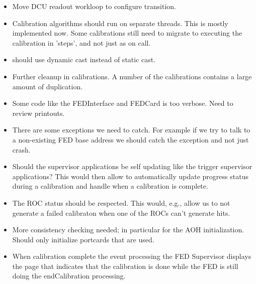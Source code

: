 \begin{itemize}
\item Move DCU readout workloop to configure transition.
\item Calibration algorithms should run on separate threads.
      This is mostly implemented now. Some calibrations 
      still need to migrate to executing the calibration
      in 'steps', and not just as on call. 
\item should use dynamic cast instead of static cast.
\item Further cleanup in calibrations. A number of the
      calibrations contains a large amount of duplication.
\item Some code like the FEDInterface and FEDCard is too verbose.
      Need to review printouts.
\item There are some exceptions we need to catch. For example
      if we try to talk to a non-existing FED base address we
      should catch the exception and not just crash.
\item Should the supervisor applications be self updating like
      the trigger supervisor applications? This would then allow
      to automatically update progress status during a calibration
      and handle when a calibration is complete.
\item The ROC status should be respected. This would, e.g., allow
      us to not generate a failed calibraton when one of the
      ROCs can't generate hits.
\item More consistency checking needed; in particular for the AOH
      initialization. Should only initialize portcards that are
      used.
\item When calibration complete the event processing the FED Supervisor
      displays the page that indicates that the calibration is done
      while the FED is still doing the endCalibration processing.
\end{itemize}



\clearpage










